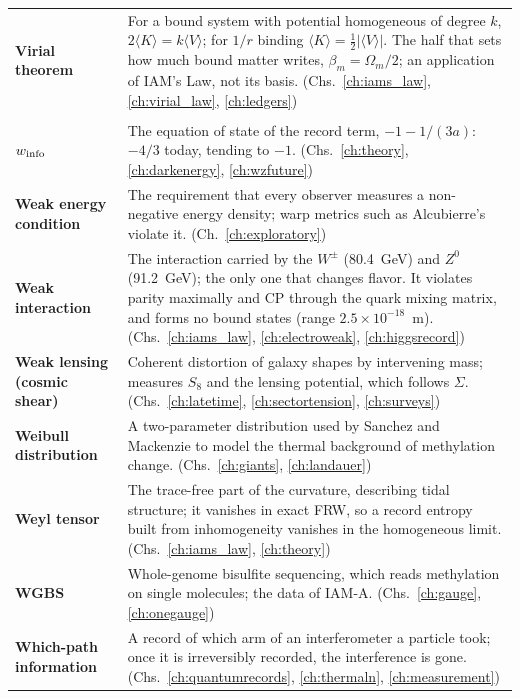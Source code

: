 {\begin{longtable}{@{}>{\raggedright\arraybackslash}p{}>{\raggedright\arraybackslash}p{}@{}}
\textbf{Virial theorem} & For a bound system with potential homogeneous of degree $k$, $2\langle K\rangle=k\langle V\rangle$; for $1/r$ binding $\langle K\rangle=\tfrac12|\langle V\rangle|$. The half that sets how much bound matter writes, $\beta_m=\Omega_m/2$; an application of IAM's Law, not its basis. {\footnotesize(Chs.~\ref{ch:iams_law}, \ref{ch:virial_law}, \ref{ch:ledgers})}\\[1pt]
\multicolumn{2}{@{}l}{\normalsize\textbf{W}}\\[2pt]
\textbf{$w_{\rm info}$} & The equation of state of the record term, $-1-1/(3a)$: $-4/3$ today, tending to $-1$. {\footnotesize(Chs.~\ref{ch:theory}, \ref{ch:darkenergy}, \ref{ch:wzfuture})}\\[1pt]
\textbf{Weak energy condition} & The requirement that every observer measures a non-negative energy density; warp metrics such as Alcubierre's violate it. {\footnotesize(Ch.~\ref{ch:exploratory})}\\[1pt]
\textbf{Weak interaction} & The interaction carried by the $W^\pm$ (80.4~GeV) and $Z^0$ (91.2~GeV); the only one that changes flavor. It violates parity maximally and CP through the quark mixing matrix, and forms no bound states (range $2.5\times10^{-18}$~m). {\footnotesize(Chs.~\ref{ch:iams_law}, \ref{ch:electroweak}, \ref{ch:higgsrecord})}\\[1pt]
\textbf{Weak lensing (cosmic shear)} & Coherent distortion of galaxy shapes by intervening mass; measures $S_8$ and the lensing potential, which follows $\Sigma$. {\footnotesize(Chs.~\ref{ch:latetime}, \ref{ch:sectortension}, \ref{ch:surveys})}\\[1pt]
\textbf{Weibull distribution} & A two-parameter distribution used by Sanchez and Mackenzie to model the thermal background of methylation change. {\footnotesize(Chs.~\ref{ch:giants}, \ref{ch:landauer})}\\[1pt]
\textbf{Weyl tensor} & The trace-free part of the curvature, describing tidal structure; it vanishes in exact FRW, so a record entropy built from inhomogeneity vanishes in the homogeneous limit. {\footnotesize(Chs.~\ref{ch:iams_law}, \ref{ch:theory})}\\[1pt]
\textbf{WGBS} & Whole-genome bisulfite sequencing, which reads methylation on single molecules; the data of IAM-A. {\footnotesize(Chs.~\ref{ch:gauge}, \ref{ch:onegauge})}\\[1pt]
\textbf{Which-path information} & A record of which arm of an interferometer a particle took; once it is irreversibly recorded, the interference is gone. {\footnotesize(Chs.~\ref{ch:quantumrecords}, \ref{ch:thermaln}, \ref{ch:measurement})}\\[1pt]

\end{longtable}}
